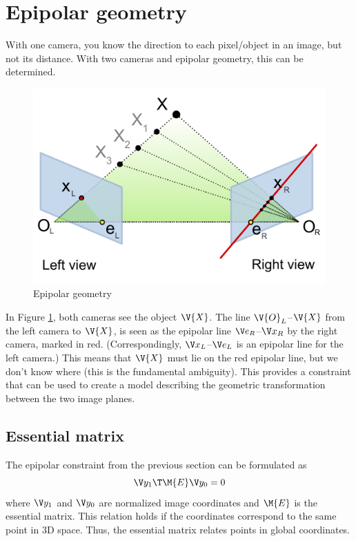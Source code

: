\section{Epipolar geometry}
With one camera, you know the direction to each pixel/object in an image, but not its distance. With two cameras and epipolar geometry, this can be determined.

\begin{figure}[htbp]
    \centering
    \includegraphics[width=0.95\linewidth]{images/Epipolar_geometry}
    \caption{Epipolar geometry}
    \label{fig:epipolar-geometry}
\end{figure}

In Figure \ref{fig:epipolar-geometry}, both cameras see the object $\V{X}$. The line $\V{O}_L$--$\V{X}$ from the left camera to $\V{X}$, is seen as the epipolar line $\e_R$--$\x_R$ by the right camera, marked in red. (Correspondingly, $\x_L$--$\e_L$ is an epipolar line for the left camera.) This means that $\V{X}$ must lie on the red epipolar line, but we don't know where (this is the fundamental ambiguity). This provides a constraint that can be used to create a model describing the geometric transformation between the two image planes.

\subsection{Essential matrix}
The epipolar constraint from the previous section can be formulated as
\begin{equation}
    \y_1\T \M{E} \y_0 = 0
\end{equation}
where $\y_1$ and $\y_0$ are normalized image coordinates and $\M{E}$ is the essential matrix. This relation holds if the coordinates correspond to the same point in 3D space. Thus, the essential matrix relates points in global coordinates.

